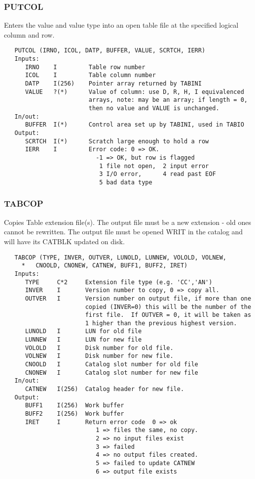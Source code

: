 \subsubsection{PUTCOL}
Enters the value and value type into an open table file
at the specified logical column and row.
\begin{verbatim}
   PUTCOL (IRNO, ICOL, DATP, BUFFER, VALUE, SCRTCH, IERR)
   Inputs:
      IRNO    I         Table row number
      ICOL    I         Table column number
      DATP    I(256)    Pointer array returned by TABINI
      VALUE   ?(*)      Value of column: use D, R, H, I equivalenced
                        arrays, note: may be an array; if length = 0,
                        then no value and VALUE is unchanged.
   In/out:
      BUFFER  I(*)      Control area set up by TABINI, used in TABIO
   Output:
      SCRTCH  I(*)      Scratch large enough to hold a row
      IERR    I         Error code: 0 => OK.
                          -1 => OK, but row is flagged
                           1 file not open,  2 input error
                           3 I/O error,      4 read past EOF
                           5 bad data type
\end{verbatim}

\subsubsection{TABCOP}
Copies Table extension file(s).  The output file must be a
new extension - old ones cannot be rewritten.  The output file
must be opened WRIT in the catalog and will have its CATBLK
updated on disk.
\begin{verbatim}
   TABCOP (TYPE, INVER, OUTVER, LUNOLD, LUNNEW, VOLOLD, VOLNEW,
     *   CNOOLD, CNONEW, CATNEW, BUFF1, BUFF2, IRET)
   Inputs:
      TYPE     C*2     Extension file type (e.g. 'CC','AN')
      INVER    I       Version number to copy, 0 => copy all.
      OUTVER   I       Version number on output file, if more than one
                       copied (INVER=0) this will be the number of the
                       first file.  If OUTVER = 0, it will be taken as
                       1 higher than the previous highest version.
      LUNOLD   I       LUN for old file
      LUNNEW   I       LUN for new file
      VOLOLD   I       Disk number for old file.
      VOLNEW   I       Disk number for new file.
      CNOOLD   I       Catalog slot number for old file
      CNONEW   I       Catalog slot number for new file
   In/out:
      CATNEW   I(256)  Catalog header for new file.
   Output:
      BUFF1    I(256)  Work buffer
      BUFF2    I(256)  Work buffer
      IRET     I       Return error code  0 => ok
                          1 => files the same, no copy.
                          2 => no input files exist
                          3 => failed
                          4 => no output files created.
                          5 => failed to update CATNEW
                          6 => output file exists
\end{verbatim}

